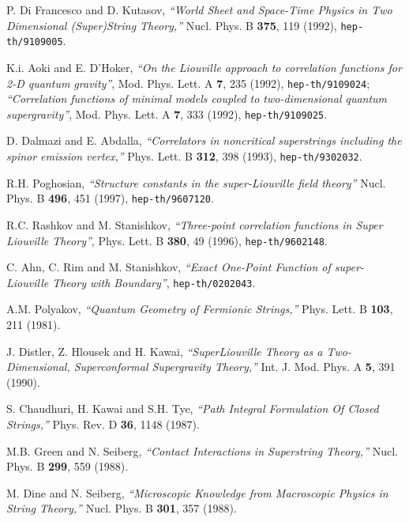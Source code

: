 \documentclass[a4paper,12pt]{article}
\begin{document}
 P. Di Francesco and D. Kutasov,
    {\sl ``World Sheet and Space-Time Physics
           in Two Dimensional (Super)String Theory,''}
    Nucl. Phys. B {\bf 375}, 119 (1992),
    {\tt hep-th/9109005}.

 K.i. Aoki and E. D'Hoker,
    {\sl ``On the Liouville approach to correlation functions
           for 2-D quantum gravity''},
    Mod. Phys. Lett. A {\bf 7}, 235 (1992),
    {\tt hep-th/9109024};
    {\sl ``Correlation functions of minimal models coupled to
           two-dimensional quantum supergravity''},
    Mod. Phys. Lett. A {\bf 7}, 333 (1992),
    {\tt hep-th/9109025}.

 D. Dalmazi and E. Abdalla,
    {\sl ``Correlators in noncritical superstrings including
           the spinor emission vertex,''}
    Phys. Lett. B {\bf 312}, 398 (1993),
    {\tt hep-th/9302032}.

 R.H. Poghosian,
    {\sl ``Structure constants in the \coordHE{} super-Liouville field theory''}
    Nucl. Phys. B {\bf 496}, 451 (1997),
    {\tt hep-th/9607120}.

 R.C. Rashkov and M. Stanishkov,
    {\sl ``Three-point correlation functions
           in \coordHE{} Super Liouville Theory''},
    Phys. Lett. B {\bf 380}, 49 (1996),
    {\tt hep-th/9602148}.

 C. Ahn, C. Rim and M. Stanishkov,
    {\sl ``Exact One-Point Function of \coordHE{} super-Liouville
           Theory with Boundary''},
    {\tt hep-th/0202043}.

 A.M. Polyakov,
    {\sl ``Quantum Geometry of Fermionic Strings,''}
    Phys. Lett. B {\bf 103}, 211 (1981).

 J. Distler, Z. Hlousek and H. Kawai,
    {\sl ``SuperLiouville Theory as a Two-Dimensional, Superconformal
           Supergravity Theory,''}
    Int. J. Mod. Phys. A {\bf 5}, 391 (1990).

 S. Chaudhuri, H. Kawai and S.H. Tye,
    {\sl ``Path Integral Formulation Of Closed Strings,''}
    Phys. Rev. D {\bf 36}, 1148 (1987).

 M.B. Green and N. Seiberg,
    {\sl ``Contact Interactions in Superstring Theory,''}
    Nucl. Phys. B {\bf 299}, 559 (1988).

 M. Dine and N. Seiberg,
    {\sl ``Microscopic Knowledge from Macroscopic Physics in String Theory,''}
    Nucl. Phys. B {\bf 301}, 357 (1988).
\end{document}
